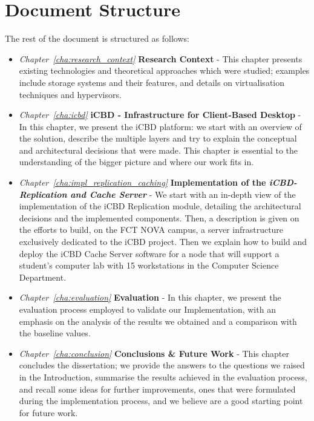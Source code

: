 \section{Document Structure} %
\label{sec:intro_document_structure}

The rest of the document is structured as follows:

\begin{itemize}
  \item \textit{Chapter~\ref{cha:research_context}}  \textbf{Research Context} - This chapter presents existing technologies and theoretical approaches which were studied; examples include storage systems and their features, and details on virtualisation techniques and hypervisors.
  \item \textit{Chapter~\ref{cha:icbd}} \textbf{iCBD - Infrastructure for Client-Based Desktop} - In this chapter, we present the iCBD platform: we start with an overview of the solution, describe the multiple layers and try to explain the conceptual and architectural decisions that were made. This chapter is essential to the understanding of the bigger picture and where our work fits in.
  \item \textit{Chapter~\ref{cha:impl_replication_caching}} \textbf{Implementation of the \textit{iCBD-Replication and Cache Server}} - We start with an in-depth view of the implementation of the iCBD Replication module, detailing the architectural decisions and the implemented components. Then, a description is given on the efforts to build, on the FCT NOVA campus, a server infrastructure exclusively dedicated to the iCBD project. Then we explain how to build and deploy the iCBD Cache Server software for a node that will support a student’s computer lab with 15 workstations in the Computer Science Department.
  \item \textit{Chapter~\ref{cha:evaluation}} \textbf{Evaluation} - In this chapter, we present the evaluation process employed to validate our Implementation, with an emphasis on the analysis of the results we obtained and a comparison with the baseline values.
  \item \textit{Chapter~\ref{cha:conclusion}} \textbf{Conclusions \& Future Work} - This chapter concludes the dissertation; we provide the answers to the questions we raised in the Introduction, summarise the results achieved in the evaluation process, and recall some ideas for further improvements, ones that were formulated during the implementation process, and we believe are a good starting point for future work.
\end{itemize}

